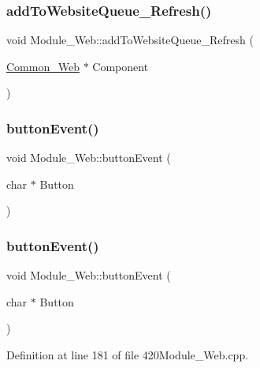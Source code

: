 \subsubsection{\texorpdfstring{add\+To\+Website\+Queue\+\_\+\+Refresh()}{addToWebsiteQueue\_Refresh()}\hspace{0.1cm}{\footnotesize\ttfamily [2/2]}}
{\footnotesize\ttfamily void Module\+\_\+\+Web\+::add\+To\+Website\+Queue\+\_\+\+Refresh (\begin{DoxyParamCaption}\item[{\hyperlink{class_common___web}{Common\+\_\+\+Web} $\ast$}]{Component }\end{DoxyParamCaption})}

\mbox{\label{class_module___web_a522480d9045dd335a7679a7ab1c73b48}} 
\subsubsection{\texorpdfstring{button\+Event()}{buttonEvent()}\hspace{0.1cm}{\footnotesize\ttfamily [1/2]}}
{\footnotesize\ttfamily void Module\+\_\+\+Web\+::button\+Event (\begin{DoxyParamCaption}\item[{char $\ast$}]{Button }\end{DoxyParamCaption})}

\mbox{\label{class_module___web_a522480d9045dd335a7679a7ab1c73b48}} 
\subsubsection{\texorpdfstring{button\+Event()}{buttonEvent()}\hspace{0.1cm}{\footnotesize\ttfamily [2/2]}}
{\footnotesize\ttfamily void Module\+\_\+\+Web\+::button\+Event (\begin{DoxyParamCaption}\item[{char $\ast$}]{Button }\end{DoxyParamCaption})}



Definition at line 181 of file 420\+Module\+\_\+\+Web.\+cpp.

